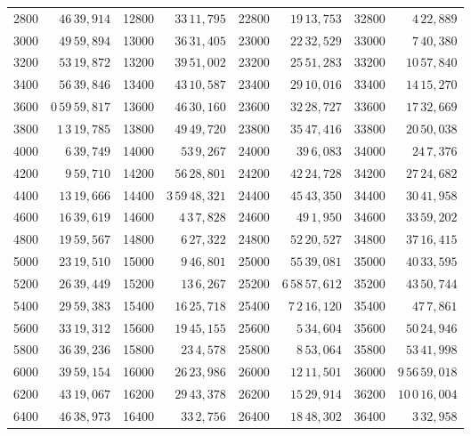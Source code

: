\begin{tabular}{|r|r||r|r||r|r||r|r|}
2800 & \(46\,39,914\) & 12800 & \(33\,11,795\) & 22800 & \(19\,13,753\) & 32800 & \(4\,22,889\) \\[1pt]
3000 & \(49\,59,894\) & 13000 & \(36\,31,405\) & 23000 & \(22\,32,529\) & 33000 & \(7\,40,380\) \\[1pt]
3200 & \(53\,19,872\) & 13200 & \(39\,51,002\) & 23200 & \(25\,51,283\) & 33200 & \(10\,57,840\) \\
3400 & \(56\,39,846\) & 13400 & \(43\,10,587\) & 23400 & \(29\,10,016\) & 33400 & \(14\,15,270\) \\
3600 & \(0\,59\,59,817\) & 13600 & \(46\,30,160\) & 23600 & \(32\,28,727\) & 33600 & \(17\,32,669\) \\
3800 & \(1\,3\,19,785\) & 13800 & \(49\,49,720\) & 23800 & \(35\,47,416\) & 33800 & \(20\,50,038\) \\[1pt]
4000 & \(6\,39,749\) & 14000 & \(53\,9,267\) & 24000 & \(39\,6,083\) & 34000 & \(24\,7,376\) \\[1pt]
4200 & \(9\,59,710\) & 14200 & \(56\,28,801\) & 24200 & \(42\,24,728\) & 34200 & \(27\,24,682\) \\
4400 & \(13\,19,666\) & 14400 & \(3\,59\,48,321\) & 24400 & \(45\,43,350\) & 34400 & \(30\,41,958\) \\
4600 & \(16\,39,619\) & 14600 & \(4\,3\,7,828\) & 24600 & \(49\,1,950\) & 34600 & \(33\,59,202\) \\
4800 & \(19\,59,567\) & 14800 & \(6\,27,322\) & 24800 & \(52\,20,527\) & 34800 & \(37\,16,415\) \\[1pt]
5000 & \(23\,19,510\) & 15000 & \(9\,46,801\) & 25000 & \(55\,39,081\) & 35000 & \(40\,33,595\) \\[1pt]
5200 & \(26\,39,449\) & 15200 & \(13\,6,267\) & 25200 & \(6\,58\,57,612\) & 35200 & \(43\,50,744\) \\
5400 & \(29\,59,383\) & 15400 & \(16\,25,718\) & 25400 & \(7\,2\,16,120\) & 35400 & \(47\,7,861\) \\
5600 & \(33\,19,312\) & 15600 & \(19\,45,155\) & 25600 & \(5\,34,604\) & 35600 & \(50\,24,946\) \\
5800 & \(36\,39,236\) & 15800 & \(23\,4,578\) & 25800 & \(8\,53,064\) & 35800 & \(53\,41,998\) \\[1pt]
6000 & \(39\,59,154\) & 16000 & \(26\,23,986\) & 26000 & \(12\,11,501\) & 36000 & \(9\,56\,59,018\) \\[1pt]
6200 & \(43\,19,067\) & 16200 & \(29\,43,378\) & 26200 & \(15\,29,914\) & 36200 & \(10\,0\,16,004\) \\
6400 & \(46\,38,973\) & 16400 & \(33\,2,756\) & 26400 & \(18\,48,302\) & 36400 & \(3\,32,958\) \\

\end{tabular}
